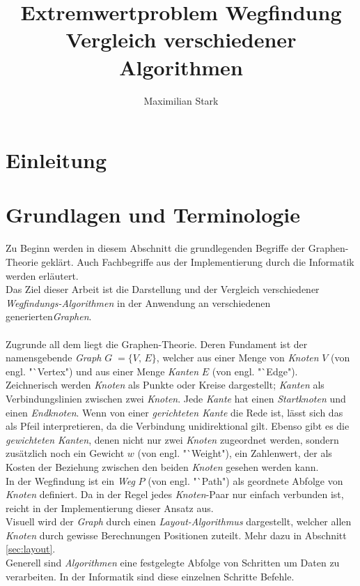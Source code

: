 \documentclass[12pt]{article}
\begin{document}
\title{Extremwertproblem Wegfindung \\  \large{\enspace Vergleich verschiedener Algorithmen}}

\author{Maximilian Stark}

\maketitle
\thispagestyle{empty}
\clearpage

\tableofcontents
\thispagestyle{empty}
\clearpage

\section{Einleitung}
\newpage

\section{Grundlagen und Terminologie}
Zu Beginn werden in diesem Abschnitt die grundlegenden Begriffe der Graphen-Theorie geklärt. Auch Fachbegriffe aus der Implementierung durch die Informatik werden erläutert.
\\
Das Ziel dieser Arbeit ist die Darstellung und der Vergleich verschiedener \textit{Wegfindungs-Algorithmen} in der Anwendung an verschiedenen generierten\textit{Graphen}.
\\\\
Zugrunde all dem liegt die Graphen-Theorie. Deren Fundament ist der namensgebende \textit{Graph} $G\; = \{V,\,E\}$, welcher aus einer Menge von \textit{Knoten} $V$ (von engl. "`Vertex") und aus einer Menge \textit{Kanten} $E$ (von engl. "`Edge").
\\
Zeichnerisch werden \textit{Knoten} als Punkte oder Kreise dargestellt; \textit{Kanten} als Verbindungslinien zwischen zwei \textit{Knoten}. Jede \textit{Kante} hat einen \textit{Startknoten} und einen \textit{Endknoten}. Wenn von einer \textit{gerichteten Kante} die Rede ist, lässt sich das als Pfeil interpretieren, da die Verbindung unidirektional gilt. Ebenso gibt es die \textit{gewichteten Kanten}, denen nicht nur zwei \textit{Knoten} zugeordnet werden, sondern zusätzlich noch ein Gewicht $w$ (von engl. "`Weight"), ein Zahlenwert, der als Kosten der Beziehung zwischen den beiden \textit{Knoten} gesehen werden kann.
\\
In der Wegfindung ist ein \textit{Weg} $P$ (von engl. "`Path") als geordnete Abfolge von \textit{Knoten} definiert. Da in der Regel jedes \textit{Knoten}-Paar nur einfach verbunden ist, reicht in der Implementierung dieser Ansatz aus.
\\
Visuell wird der \textit{Graph} durch einen \textit{Layout-Algorithmus} dargestellt, welcher allen \textit{Knoten} durch gewisse Berechnungen Positionen zuteilt. Mehr dazu in Abschnitt \ref{sec:layout}.
\\
Generell sind \textit{Algorithmen} eine festgelegte Abfolge von Schritten um Daten zu verarbeiten. In der Informatik sind diese einzelnen Schritte Befehle.
\newpage
\end{document}
